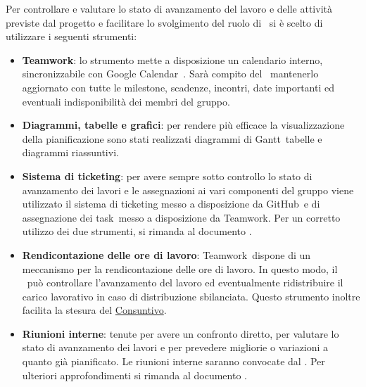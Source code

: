 \documentclass[../PianoProgetto.tex]{subfiles}
\begin{document}
Per controllare e valutare lo stato di avanzamento del lavoro e delle attività previste dal progetto e facilitare lo svolgimento del ruolo di \responsabilediprogetto\ si è scelto di utilizzare i seguenti strumenti:
	\begin{itemize}
	\item \textbf{Teamwork}: lo strumento mette a disposizione un calendario interno, sincronizzabile con Google Calendar\g\ . Sarà compito del \responsabilediprogetto\ mantenerlo aggiornato con tutte le milestone\g, scadenze, incontri, date importanti ed eventuali indisponibilità dei membri del gruppo.
	\item \textbf{Diagrammi, tabelle e grafici}: per rendere più efficace la visualizzazione della pianificazione sono stati realizzati diagrammi di Gantt\g\, tabelle e diagrammi riassuntivi.
	\item \textbf{Sistema di ticketing}: per avere sempre sotto controllo lo stato di avanzamento dei lavori e le assegnazioni ai vari componenti del gruppo viene utilizzato il sistema di ticketing messo a disposizione da GitHub\g\ e di assegnazione dei task\g\ messo a disposizione da Teamwork\g. Per un corretto utilizzo dei due strumenti, si rimanda al documento \normediprogettov .
	\item \textbf{Rendicontazione delle ore di lavoro}: Teamwork\g\ dispone di un meccanismo per la rendicontazione delle ore di lavoro. In questo modo, il \responsabilediprogetto\ può controllare l'avanzamento del lavoro ed eventualmente ridistribuire il carico lavorativo in caso di distribuzione sbilanciata. Questo strumento inoltre facilita la stesura del \hyperref[sec:consuntivo]{Consuntivo}.
	\item \textbf{Riunioni interne}: tenute per avere un confronto diretto, per valutare lo stato di avanzamento dei lavori e per prevedere migliorie o variazioni a quanto già pianificato. Le riunioni interne saranno convocate dal \responsabilediprogetto . Per ulteriori approfondimenti si rimanda al documento \normediprogettov .
	\end{itemize}
	
\end{document}
